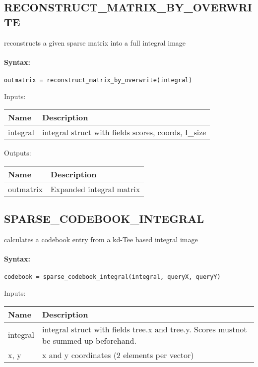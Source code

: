 \subsection{RECONSTRUCT\_MATRIX\_BY\_OVERWRITE}

reconstructs a given sparse matrix into a full integral image

\paragraph{Syntax:} \verb|outmatrix = reconstruct_matrix_by_overwrite(integral)|

\bigskip
Inputs:

\begin{tabular}{|p{}|p{}|}
\hline
\textbf{Name} & \textbf{Description} \\
\hline \hline
integral & integral struct with fields scores, coords, I\_size  \\ \hline
\end{tabular}

\bigskip
Outputs:

\begin{tabular}{|p{}|p{}|}
\hline
\textbf{Name} & \textbf{Description} \\
\hline \hline
outmatrix & Expanded integral matrix  \\ \hline
\end{tabular}

\subsection{SPARSE\_CODEBOOK\_INTEGRAL}

calculates a codebook entry from a kd-Tee based integral image

\paragraph{Syntax:} \verb|codebook = sparse_codebook_integral(integral, queryX, queryY)|

\bigskip
Inputs:

\begin{tabular}{|p{}|p{}|}
\hline
\textbf{Name} & \textbf{Description} \\
\hline \hline
integral & integral struct with fields tree.x and tree.y. Scores mustnot be summed up beforehand.  \\ \hline
x, y & x and y coordinates (2 elements per vector)  \\ \hline
\end{tabular}

